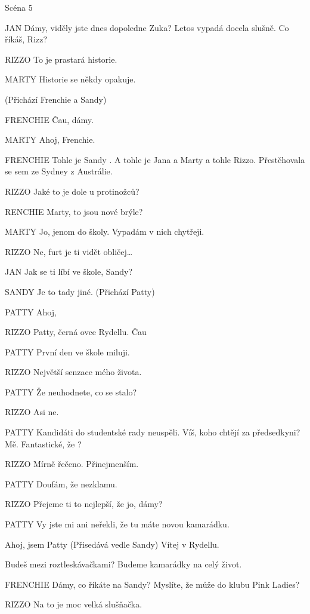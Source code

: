 Scéna 5 

JAN        Dámy, viděly jste dnes dopoledne Zuka? Letos vypadá docela slušně.         Co říkáš, Rizz?

RIZZO        To je prastará historie.

MARTY        Historie se někdy opakuje.

        (Přichází Frenchie a Sandy)

FRENCHIE        Čau, dámy.

MARTY        Ahoj, Frenchie.

FRENCHIE        Tohle je Sandy . A tohle je Jana a Marty a tohle Rizzo. Přestěhovala se         sem ze Sydney z Austrálie.

RIZZO        Jaké to je dole u protinožců?

RENCHIE        Marty, to jsou nové brýle?

MARTY        Jo, jenom do školy. Vypadám v nich chytřeji.

RIZZO        Ne, furt je ti vidět obličej…

JAN        Jak se ti líbí ve škole, Sandy?

SANDY        Je to tady jiné. (Přichází Patty)

PATTY        Ahoj, 

RIZZO        Patty, černá ovce Rydellu. Čau

PATTY        První den ve škole miluji.

RIZZO        Největší senzace mého života.

PATTY        Že neuhodnete, co se stalo?

RIZZO        Asi ne.

PATTY        Kandidáti do studentské rady neuspěli. Víš, koho chtějí za                         předsedkyni? Mě. Fantastické, že ?

RIZZO        Mírně řečeno. Přinejmenším.

PATTY        Doufám, že nezklamu.

RIZZO        Přejeme ti to nejlepší, že jo, dámy?

PATTY        Vy jste mi ani neřekli, že tu máte novou kamarádku.

                Ahoj, jsem Patty (Přisedává vedle Sandy) Vítej v Rydellu.

                Budeš mezi roztleskávačkami? Budeme kamarádky na celý život.

FRENCHIE        Dámy, co říkáte na Sandy? Myslíte, že může do klubu Pink Ladies?

RIZZO        Na to je moc velká slušňačka.

